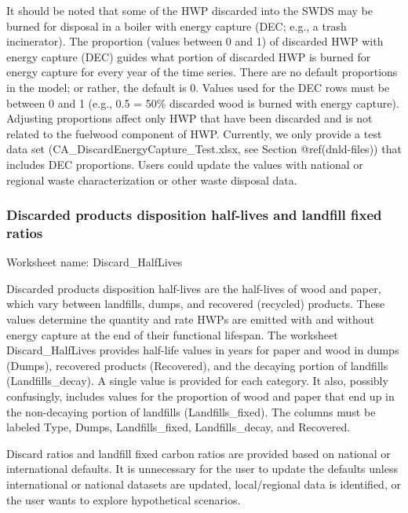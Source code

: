 \documentclass[
  openany]{book}
\begin{document}
It should be noted that some of the HWP discarded into the SWDS may be
burned for disposal in a boiler with energy capture (DEC; e.g., a trash
incinerator). The proportion (values between 0 and 1) of discarded HWP
with energy capture (DEC) guides what portion of discarded HWP is burned
for energy capture for every year of the time series. There are no
default proportions in the model; or rather, the default is 0. Values
used for the DEC rows must be between 0 and 1 (e.g., 0.5 = 50\%
discarded wood is burned with energy capture). Adjusting proportions
affect only HWP that have been discarded and is not related to the
fuelwood component of HWP. Currently, we only provide a test data set
(CA\_DiscardEnergyCapture\_Test.xlsx, see Section @ref(dnld-files)) that
includes DEC proportions. Users could update the values with national or
regional waste characterization or other waste disposal data.

\hypertarget{own-prov-input-discHL}{%
\subsubsection{Discarded products disposition half-lives and landfill
fixed ratios}\label{own-prov-input-discHL}}

Worksheet name: Discard\_HalfLives

Discarded products disposition half-lives are the half-lives of wood and
paper, which vary between landfills, dumps, and recovered (recycled)
products. These values determine the quantity and rate HWPs are emitted
with and without energy capture at the end of their functional lifespan.
The worksheet Discard\_HalfLives provides half-life values in years for
paper and wood in dumps (Dumps), recovered products (Recovered), and the
decaying portion of landfills (Landfills\_decay). A single value is
provided for each category. It also, possibly confusingly, includes
values for the proportion of wood and paper that end up in the
non-decaying portion of landfills (Landfills\_fixed). The columns must
be labeled Type, Dumps, Landfills\_fixed, Landfills\_decay, and
Recovered.

Discard ratios and landfill fixed carbon ratios are provided based on
national or international defaults. It is unnecessary for the user to
update the defaults unless international or national datasets are
updated, local/regional data is identified, or the user wants to explore
hypothetical scenarios.
\end{document}
